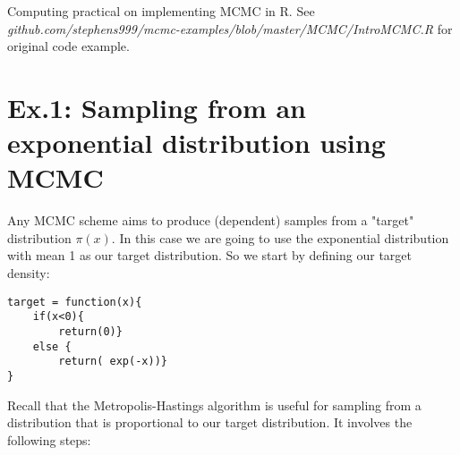 \documentclass[12pt]{report}
\begin{document}

\maketitle

\vspace*{.1in}




Computing practical on implementing MCMC in R. See \textit{github.com/stephens999/mcmc-examples/blob/master/MCMC/IntroMCMC.R} for original code example.


\section{Ex.1: Sampling from an exponential distribution using MCMC}
Any MCMC scheme aims to produce (dependent) samples from a "target" distribution $\pi \left (x \right )$.
In this case we are going to use the exponential distribution with mean 1 as our target distribution. So we start by defining our target density: 

\begin{lstlisting}
target = function(x){
    if(x<0){
        return(0)}
    else {
        return( exp(-x))}
}
\end{lstlisting}

Recall that the Metropolis-Hastings algorithm is useful for sampling from a distribution that is proportional to our target distribution. It involves the following steps: 
\end{document}
